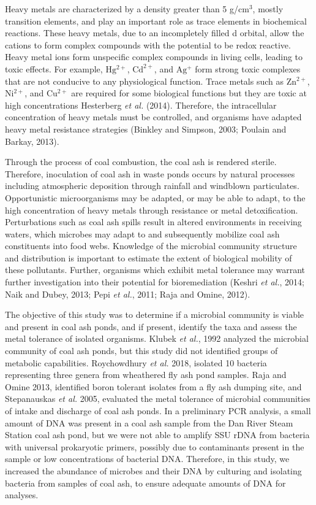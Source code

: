 \documentclass[ms, hidelinks]{uncgdissertationexp}
\theoremstyle{plain}
\theoremstyle{definition}
\theoremstyle{remark}
\begin{document}
Heavy metals are characterized by a density greater than 5 g/\(\mathrm{cm^3}\), mostly transition elements, and play an important role as trace elements in biochemical reactions. These heavy metals, due to an incompletely filled d orbital, allow the cations to form complex compounds with the potential to be redox reactive. Heavy metal ions form unspecific complex compounds in living cells, leading to toxic effects. For example, \(\mathrm{Hg^{2+}}\), \(\mathrm{Cd^{2+}}\), and \(\mathrm{Ag^{+}}\) form strong toxic complexes that are not conducive to any physiological function. Trace metals such as \(\mathrm{Zn^{2+}}\), \(\mathrm{Ni^{2+}}\), and \(\mathrm{Cu^{2+}}\) are required for some biological functions but they are toxic at high concentrations Hesterberg \emph{et al.} (2014). Therefore, the intracellular concentration of heavy metals must be controlled, and organisms have adapted heavy metal resistance strategies (Binkley and Simpson, 2003; Poulain and Barkay, 2013).

Through the process of coal combustion, the coal ash is rendered sterile. Therefore, inoculation of coal ash in waste ponds occurs by natural processes including atmospheric deposition through rainfall and windblown particulates. Opportunistic microorganisms may be adapted, or may be able to adapt, to the high concentration of heavy metals through resistance or metal detoxification. Perturbations such as coal ash spills result in altered environments in receiving waters, which microbes may adapt to and subsequently mobilize coal ash constituents into food webs. Knowledge of the microbial community structure and distribution is important to estimate the extent of biological mobility of these pollutants. Further, organisms which exhibit metal tolerance may warrant further investigation into their potential for bioremediation (Keshri \emph{et al.}, 2014; Naik and Dubey, 2013; Pepi \emph{et al.}, 2011; Raja and Omine, 2012).

The objective of this study was to determine if a microbial community is viable and present in coal ash ponds, and if present, identify the taxa and assess the metal tolerance of isolated organisms. Klubek \emph{et al.}, 1992 analyzed the microbial community of coal ash ponds, but this study did not identified groups of metabolic capabilities. Roychowdhury \emph{et al.} 2018, isolated 10 bacteria representing three genera from wheathered fly ash pond samples. Raja and Omine 2013, identified boron tolerant isolates from a fly ash dumping site, and Stepanauskas \emph{et al.} 2005, evaluated the metal tolerance of microbial communities of intake and discharge of coal ash ponds. In a preliminary PCR analysis, a small amount of DNA was present in a coal ash sample from the Dan River Steam Station coal ash pond, but we were not able to amplify SSU rDNA from bacteria with universal prokaryotic primers, possibly due to contaminants present in the sample or low concentrations of bacterial DNA. Therefore, in this study, we increased the abundance of microbes and their DNA by culturing and isolating bacteria from samples of coal ash, to ensure adequate amounts of DNA for analyses.
\end{document}
